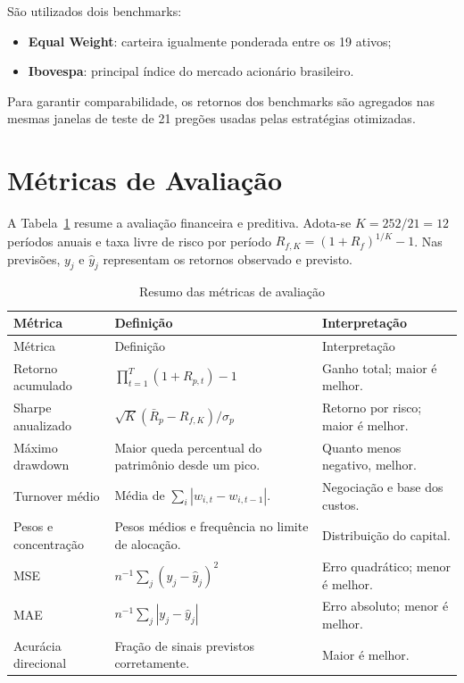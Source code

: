 \documentclass[12pt,a4paper]{article}
\begin{document}
São utilizados dois benchmarks:

\begin{itemize}
    \item \textbf{Equal Weight}: carteira igualmente ponderada entre os 19 ativos;
    \item \textbf{Ibovespa}: principal índice do mercado acionário brasileiro.
\end{itemize}

Para garantir comparabilidade, os retornos dos benchmarks são agregados nas mesmas janelas de teste de 21 pregões usadas pelas estratégias otimizadas.

\section{Métricas de Avaliação}
\label{sec:metricas}

A Tabela~\ref{tab:metricas} resume a avaliação financeira e preditiva. Adota-se $K=252/21=12$ períodos anuais e taxa livre de risco por período $R_{f,K}=(1+R_f)^{1/K}-1$. Nas previsões, $y_j$ e $\hat{y}_j$ representam os retornos observado e previsto.

\small
\begin{longtable}{@{}p{}p{}p{}@{}}
\caption{Resumo das métricas de avaliação}\label{tab:metricas}\\
\toprule
Métrica & Definição & Interpretação \\
\midrule
\endfirsthead
\toprule
Métrica & Definição & Interpretação \\
\midrule
\endhead
Retorno acumulado & $\prod_{t=1}^{T}(1+R_{p,t})-1$ & Ganho total; maior é melhor. \\
Sharpe anualizado & $\sqrt{K}(\bar{R}_p-R_{f,K})/\sigma_p$ & Retorno por risco; maior é melhor. \\
Máximo drawdown & Maior queda percentual do patrimônio desde um pico. & Quanto menos negativo, melhor. \\
Turnover médio & Média de $\sum_i|w_{i,t}-w_{i,t-1}|$. & Negociação e base dos custos. \\
Pesos e concentração & Pesos médios e frequência no limite de alocação. & Distribuição do capital. \\
MSE & $n^{-1}\sum_j(y_j-\hat{y}_j)^2$ & Erro quadrático; menor é melhor. \\
MAE & $n^{-1}\sum_j|y_j-\hat{y}_j|$ & Erro absoluto; menor é melhor. \\
Acurácia direcional & Fração de sinais previstos corretamente. & Maior é melhor. \\
\bottomrule
\end{longtable}
\normalsize
\end{document}
